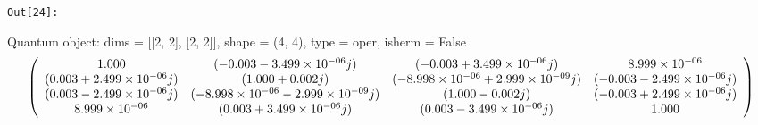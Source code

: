 \documentclass[11pt]{article}
\begin{document}
\texttt{\color{outcolor}Out[{\color{outcolor}24}]:}
    
    Quantum object: dims = [[2, 2], [2, 2]], shape = (4, 4), type = oper, isherm = False\begin{equation*}\left(\begin{array}{*{11}c}1.000 & (-0.003-3.499\times10^{-06}j) & (-0.003+3.499\times10^{-06}j) & 8.999\times10^{-06}\\(0.003+2.499\times10^{-06}j) & (1.000+0.002j) & (-8.998\times10^{-06}+2.999\times10^{-09}j) & (-0.003-2.499\times10^{-06}j)\\(0.003-2.499\times10^{-06}j) & (-8.998\times10^{-06}-2.999\times10^{-09}j) & (1.000-0.002j) & (-0.003+2.499\times10^{-06}j)\\8.999\times10^{-06} & (0.003+3.499\times10^{-06}j) & (0.003-3.499\times10^{-06}j) & 1.000\\\end{array}\right)\end{equation*}

    
\end{document}
